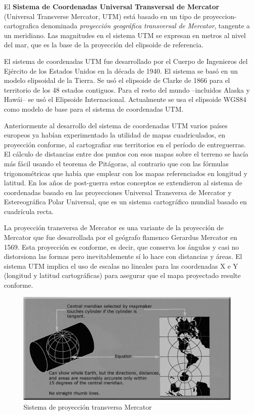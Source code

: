 El \textbf{Sistema de Coordenadas Universal Transversal de Mercator} (Universal Transverse Mercator, UTM) est\'a basado en un tipo de \gls{proyeccion-cartografica} denominada \emph{proyecci\'on geogr\'afica transversal de Mercator}, tangente a un meridiano. Las magnitudes en el sistema UTM se expresan en metros al nivel del mar, que es la base de la proyecci\'on del elipsoide de referencia.

El sistema de coordenadas UTM fue desarrollado por el Cuerpo de Ingenieros del Ejército de los Estados Unidos en la década de 1940. El sistema se basó en un modelo elipsoidal de la Tierra. Se usó el elipsoide de Clarke de 1866 para el territorio de los 48 estados contiguos. Para el resto del mundo –incluidos Alaska y Hawái– se usó el Elipsoide Internacional. Actualmente se usa el elipsoide WGS84 como modelo de base para el sistema de coordenadas UTM.

Anteriormente al desarrollo del sistema de coordenadas UTM varios países europeos ya habían experimentado la utilidad de mapas cuadriculados, en proyección conforme, al cartografiar sus territorios en el período de entreguerras. El cálculo de distancias entre dos puntos con esos mapas sobre el terreno se hacía más fácil usando el teorema de Pitágoras, al contrario que con las fórmulas trigonométricas que había que emplear con los mapas referenciados en longitud y latitud. En los años de post-guerra estos conceptos se extendieron al sistema de coordenadas basado en las proyecciones Universal Transversa de Mercator y Estereográfica Polar Universal, que es un sistema cartográfico mundial basado en cuadrícula recta.

La proyección transversa de Mercator es una variante de la proyección de Mercator que fue desarrollada por el geógrafo flamenco Gerardus Mercator en 1569. Esta proyección es conforme, es decir, que conserva los ángulos y casi no distorsiona las formas pero inevitablemente sí lo hace con distancias y áreas. El sistema UTM implica el uso de escalas no lineales para las coordenadas X e Y (longitud y latitud cartográficas) para asegurar que el mapa proyectado resulte conforme.

\begin{figure}[!htb]
  \centering
  \includegraphics[width=\textwidth]{./Imagenes/06.00.navegacion/Usgs_map_traverse_mercator.png}
  \caption{Sistema de proyecci\'on transversa Mercator}
  \label{fig:sistema.proyeccion.transversa.mercator}
\end{figure}

